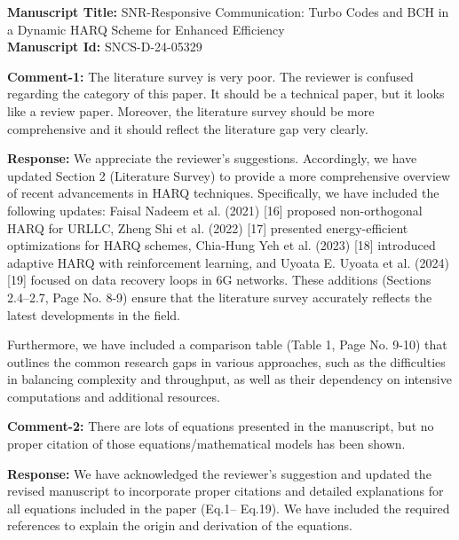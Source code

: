 \documentclass[a4paper,10pt]{article}
\begin{document}
\vspace{0.25in}

\noindent \textbf{Manuscript Title:} SNR-Responsive Communication: Turbo Codes and BCH in a Dynamic HARQ Scheme for Enhanced Efficiency  \\

\noindent \textbf{Manuscript Id:} SNCS-D-24-05329 \\


\begin{enumerate}


{\color{blue} \item \textbf{Comment-1:} The literature survey is very poor. The reviewer is confused regarding the category of this paper. It should be a technical paper, but it looks like a review paper. Moreover, the literature survey should be more comprehensive and it should reflect the literature gap very clearly.}

\textbf{Response:} We appreciate the reviewer’s suggestions. Accordingly, we have updated Section 2 (Literature Survey) to provide a more comprehensive overview of recent advancements in HARQ techniques. Specifically, we have included the following updates: Faisal Nadeem et al. (2021) [16] proposed non-orthogonal HARQ for URLLC,  Zheng Shi et al. (2022) [17] presented energy-efficient optimizations for HARQ schemes, Chia-Hung Yeh et al. (2023) [18] introduced adaptive HARQ with reinforcement learning, and Uyoata E. Uyoata et al. (2024) [19] focused on data recovery loops in 6G networks. These additions (Sections 2.4–2.7, Page No. 8-9) ensure that the literature survey accurately reflects the latest developments in the field.

Furthermore, we have included a comparison table (Table 1, Page No. 9-10) that outlines the common research gaps in various approaches, such as the difficulties in balancing complexity and throughput, as well as their dependency on intensive computations and additional resources. 


{\color{blue} \item \textbf{Comment-2:} There are lots of equations presented in the manuscript, but no proper citation of those equations/mathematical models has been shown.}

\textbf{Response:} We have acknowledged the reviewer's suggestion and updated the revised manuscript to incorporate proper citations and detailed explanations for all equations included in the paper (Eq.1– Eq.19). We have included the required references to explain the origin and derivation of the equations.




\end{enumerate}
\end{document}
